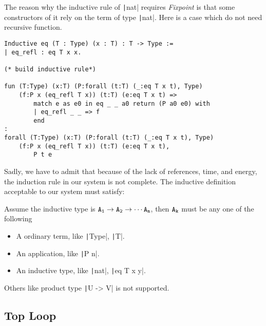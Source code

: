 The reason why the inductive rule of \texttt|nat| requires {\it Fixpoint} is that some constructors of it
rely on the term of type \texttt|nat|. Here is a case which do not need recursive function.
\begin{center}
\begin{verbatim}
Inductive eq (T : Type) (x : T) : T -> Type :=
| eq_refl : eq T x x.

(* build inductive rule*)

fun (T:Type) (x:T) (P:forall (t:T) (_:eq T x t), Type) 
    (f:P x (eq_refl T x)) (t:T) (e:eq T x t) => 
        match e as e0 in eq _ _ a0 return (P a0 e0) with 
        | eq_refl _ _ => f
        end
: 
forall (T:Type) (x:T) (P:forall (t:T) (_:eq T x t), Type) 
    (f:P x (eq_refl T x)) (t:T) (e:eq T x t),
        P t e
\end{verbatim}
\end{center}
Sadly, we have to admit that because of the lack of references, time, and energy,
the induction rule in our system is not complete.
The inductive definition acceptable to our system must satisfy:\par
Assume the inductive type is $\tt A_1\to A_2\to \cdots A_n$, then $\tt A_k$ must be
any one of the following
\begin{itemize}
\item A ordinary term, like \texttt|Type|, \texttt|T|.
\item An application, like \texttt|P n|.
\item An inductive type, like \texttt|nat|, \texttt|eq T x y|.
\end{itemize}
Others like product type \texttt|U -> V| is not supported.


\subsection{Top Loop}
